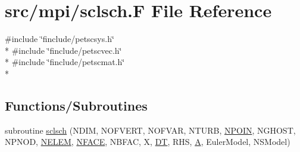 \hypertarget{mpi_2sclsch_8_f}{\section{src/mpi/sclsch.F File Reference}
\label{mpi_2sclsch_8_f}
}
{\ttfamily \#include \char`\"{}finclude/petscsys.\-h\char`\"{}}\\*
{\ttfamily \#include \char`\"{}finclude/petscvec.\-h\char`\"{}}\\*
{\ttfamily \#include \char`\"{}finclude/petscmat.\-h\char`\"{}}\\*
\subsection*{Functions/\-Subroutines}
\begin{DoxyCompactItemize}
\item 
subroutine \hyperlink{mpi_2sclsch_8_f_acf48a75f3d22cfc8a73fbca44124b965}{sclsch} (N\-D\-I\-M, N\-O\-F\-V\-E\-R\-T, N\-O\-F\-V\-A\-R, N\-T\-U\-R\-B, \hyperlink{mesh_8com_ae28c1572321efcd8715b974d87d20c58}{N\-P\-O\-I\-N}, N\-G\-H\-O\-S\-T, N\-P\-N\-O\-D, \hyperlink{mesh_8com_aee5e75b79d0e815c0603cfbccc618957}{N\-E\-L\-E\-M}, \hyperlink{mesh_8com_a78142d59d4cbb9fedbede16187658dd3}{N\-F\-A\-C\-E}, N\-B\-F\-A\-C, X, \hyperlink{myts_8com_a41549d5ede5e2b840495daf35608da41}{D\-T}, R\-H\-S, \hyperlink{ibc2_8com_ad2108d58343608772fff791c23da58f5}{A}, Euler\-Model, N\-S\-Model)
\end{DoxyCompactItemize}


